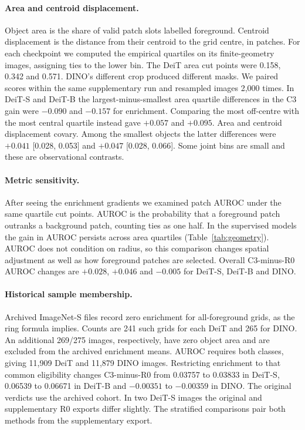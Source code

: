 \paragraph{Area and centroid displacement.} Object area is the share of valid patch slots labelled foreground. Centroid displacement is the distance from their centroid to the grid centre, in patches. For each checkpoint we computed the empirical quartiles on its finite-geometry images, assigning ties to the lower bin. The DeiT area cut points were 0.158, 0.342 and 0.571. DINO's different crop produced different masks. We paired scores within the same supplementary run and resampled images 2,000 times. In DeiT-S and DeiT-B the largest-minus-smallest area quartile differences in the C3 gain were $-0.090$ and $-0.157$ for enrichment. Comparing the most off-centre with the most central quartile instead gave $+0.057$ and $+0.095$. Area and centroid displacement covary. Among the smallest objects the latter differences were $+0.041$ [0.028, 0.053] and $+0.047$ [0.028, 0.066]. Some joint bins are small and these are observational contrasts.

\paragraph{Metric sensitivity.} After seeing the enrichment gradients we examined patch AUROC under the same quartile cut points. AUROC is the probability that a foreground patch outranks a background patch, counting ties as one half. In the supervised models the gain in AUROC persists across area quartiles (Table~\ref{tab:geometry}). AUROC does not condition on radius, so this comparison changes spatial adjustment as well as how foreground patches are selected. Overall C3-minus-R0 AUROC changes are $+0.028$, $+0.046$ and $-0.005$ for DeiT-S, DeiT-B and DINO.

\paragraph{Historical sample membership.} Archived ImageNet-S files record zero enrichment for all-foreground grids, as the ring formula implies. Counts are 241 such grids for each DeiT and 265 for DINO. An additional 269/275 images, respectively, have zero object area and are excluded from the archived enrichment means. AUROC requires both classes, giving 11,909 DeiT and 11,879 DINO images. Restricting enrichment to that common eligibility changes C3-minus-R0 from 0.03757 to 0.03833 in DeiT-S, 0.06539 to 0.06671 in DeiT-B and $-0.00351$ to $-0.00359$ in DINO. The original verdicts use the archived cohort. In two DeiT-S images the original and supplementary R0 exports differ slightly. The stratified comparisons pair both methods from the supplementary export.

\begin{center}\begin{minipage}{\linewidth}
\label{tab:geometry}\centering\small
\end{minipage}\end{center}
